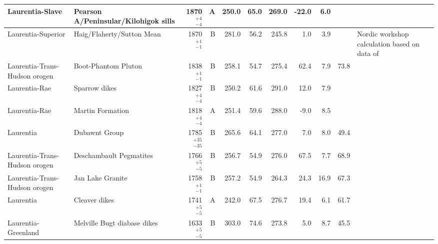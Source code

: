 \begin{ThreePartTable}
\begin{longtable}{p{1.4 in}p{1.2 in}rrrrrrrrp{1.2 in}}
               Laurentia-Slave &               Pearson A/Peninsular/Kilohigok sills &     1870$^{+4}_{-4}$ &      A &     250.0 &      65.0 & 269.0 & -22.0 &       6.0 &          &                               \cite{Mitchell2010c} \\ \hline
            Laurentia-Superior &                         Haig/Flaherty/Sutton Mean  &     1870$^{+1}_{-1}$ &      B &     281.0 &      56.2 & 245.8 &   1.0 &       3.9 &          &  Nordic workshop calculation based on data of \cite{Schmidt1980a, Schwarz1982a} \\ \hline
 Laurentia-Trans-Hudson orogen &                                Boot-Phantom Pluton &     1838$^{+1}_{-1}$ &      B &     258.1 &      54.7 & 275.4 &  62.4 &       7.9 &        73.8 &                                 \cite{Symons1999a} \\ \hline
                 Laurentia-Rae &                                      Sparrow dikes &     1827$^{+4}_{-4}$ &      B &     250.2 &      61.6 & 291.0 &  12.0 &       7.9 &          &                                \cite{McGlynn1974a} \\ \hline
                 Laurentia-Rae &                                   Martin Formation &     1818$^{+4}_{-4}$ &      A &     251.4 &      59.6 & 288.0 &  -9.0 &       8.5 &          &                                  \cite{Evans1973a} \\ \hline
                     Laurentia &                                      Dubawnt Group &   1785$^{+35}_{-35}$ &      B &     265.6 &      64.1 & 277.0 &   7.0 &       8.0 &        49.4 &                                   \cite{Park1973a} \\ \hline
 Laurentia-Trans-Hudson orogen &                            Deschambault Pegmatites &     1766$^{+5}_{-5}$ &      B &     256.7 &      54.9 & 276.0 &  67.5 &       7.7 &        68.9 &                                 \cite{Symons2000a} \\ \hline
 Laurentia-Trans-Hudson orogen &                                   Jan Lake Granite &     1758$^{+1}_{-1}$ &      B &     257.2 &      54.9 & 264.3 &  24.3 &      16.9 &        67.3 &                                   \cite{Gala1995a} \\ \hline
                     Laurentia &                                      Cleaver dikes &     1741$^{+5}_{-5}$ &      A &     242.0 &      67.5 & 276.7 &  19.4 &       6.1 &        61.7 &                                 \cite{Irving2004a} \\ \hline
           Laurentia-Greenland &                        Melville Bugt diabase dikes &     1633$^{+5}_{-5}$ &      B &     303.0 &      74.6 & 273.8 &   5.0 &       8.7 &        45.5 &                                  \cite{Halls2011a} \\ \hline

\end{longtable}
\end{ThreePartTable}
